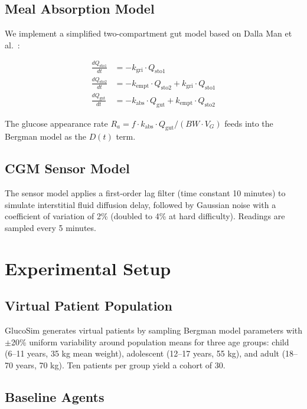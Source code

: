 \documentclass[11pt]{article}
\begin{document}
\subsection{Meal Absorption Model}

We implement a simplified two-compartment gut model based on Dalla Man et al.~\citep{dallaman2007meal}:

\begin{align}
\frac{dQ_{\text{sto1}}}{dt} &= -k_{\text{gri}} \cdot Q_{\text{sto1}} \\
\frac{dQ_{\text{sto2}}}{dt} &= -k_{\text{empt}} \cdot Q_{\text{sto2}} + k_{\text{gri}} \cdot Q_{\text{sto1}} \\
\frac{dQ_{\text{gut}}}{dt} &= -k_{\text{abs}} \cdot Q_{\text{gut}} + k_{\text{empt}} \cdot Q_{\text{sto2}}
\end{align}

The glucose appearance rate $R_a = f \cdot k_{\text{abs}} \cdot Q_{\text{gut}} / (BW \cdot V_G)$ feeds into the Bergman model as the $D(t)$ term.

\subsection{CGM Sensor Model}

The sensor model applies a first-order lag filter (time constant 10 minutes) to simulate interstitial fluid diffusion delay, followed by Gaussian noise with a coefficient of variation of 2\% (doubled to 4\% at hard difficulty). Readings are sampled every 5 minutes.

\section{Experimental Setup}

\subsection{Virtual Patient Population}

GlucoSim generates virtual patients by sampling Bergman model parameters with $\pm$20\% uniform variability around population means for three age groups: child (6--11 years, 35 kg mean weight), adolescent (12--17 years, 55 kg), and adult (18--70 years, 70 kg). Ten patients per group yield a cohort of 30.

\subsection{Baseline Agents}
\end{document}
